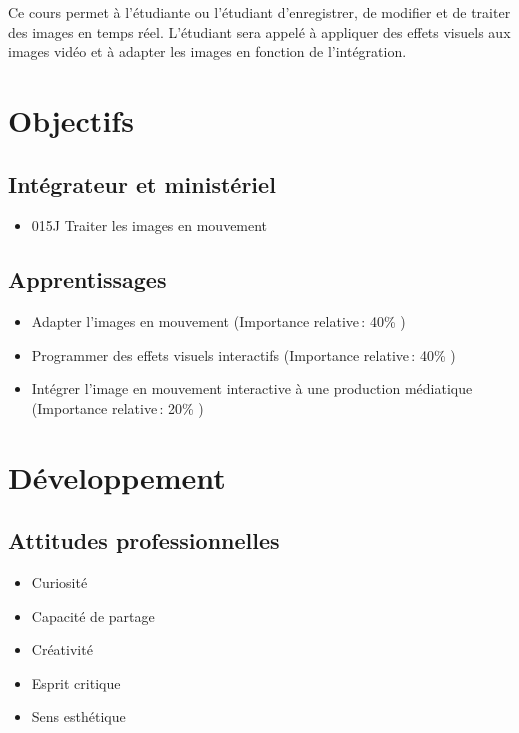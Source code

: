 \documentclass[
]{book}
\providecommand{\tightlist}{%
  \setlength{\itemsep}{0pt}\setlength{\parskip}{0pt}}
\begin{document}
Ce cours permet à l'étudiante ou l'étudiant d'enregistrer, de modifier et de traiter des images en temps réel.
L'étudiant sera appelé à appliquer des effets visuels aux images vidéo et à adapter les images en fonction de l'intégration.

\hypertarget{objectifs}{%
\section{Objectifs}\label{objectifs}}

\hypertarget{intuxe9grateur-et-ministuxe9riel}{%
\subsection{Intégrateur et ministériel}\label{intuxe9grateur-et-ministuxe9riel}}

\begin{itemize}
\tightlist
\item
  015J Traiter les images en mouvement
\end{itemize}

\hypertarget{apprentissages}{%
\subsection{Apprentissages}\label{apprentissages}}

\begin{itemize}
\tightlist
\item
  Adapter l'images en mouvement (Importance relative\,: 40\% )
\item
  Programmer des effets visuels interactifs (Importance relative\,: 40\% )
\item
  Intégrer l'image en mouvement interactive à une production médiatique (Importance relative\,: 20\% )
\end{itemize}

\hypertarget{duxe9veloppement}{%
\section{Développement}\label{duxe9veloppement}}

\hypertarget{attitudes-professionnelles}{%
\subsection{Attitudes professionnelles}\label{attitudes-professionnelles}}

\begin{itemize}
\tightlist
\item
  Curiosité
\item
  Capacité de partage
\item
  Créativité
\item
  Esprit critique
\item
  Sens esthétique
\end{itemize}
\end{document}
